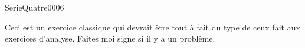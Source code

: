 
\begin{corrige}{SerieQuatre0006}

	Ceci est un exercice classique qui devrait être tout à fait du type de ceux fait aux exercices d'analyse. Faites moi signe si il y a un problème.

\end{corrige}
